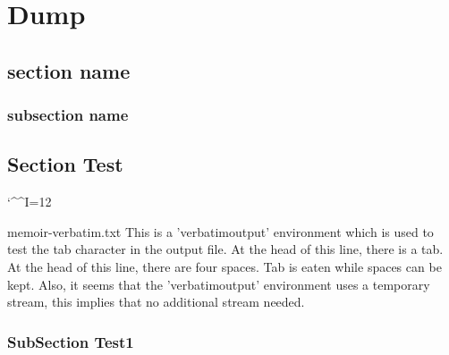 \documentclass[10pt,a4paper,extrafontsizes]{memoir}
\begin{document}


\chapter{Dump} %
\label{chap:dump}

\section{section name} %
\label{sec:section_name}



\subsection{subsection name} %
\label{sub:subsection_name}


\section{Section Test}

{
\catcode`\^^I=12
\begin{verbatimoutput}{memoir-verbatim.txt}
This is a 'verbatimoutput' environment which is used to test the tab character in the output file.
	At the head of this line, there is a tab.
    At the head of this line, there are four spaces.
Tab is eaten while spaces can be kept.
Also, it seems that the 'verbatimoutput' environment uses a temporary stream, this implies that no additional stream needed.
\end{verbatimoutput}
}

\subsection{SubSection Test1}
\label{sub:subsec1}

\end{document}
